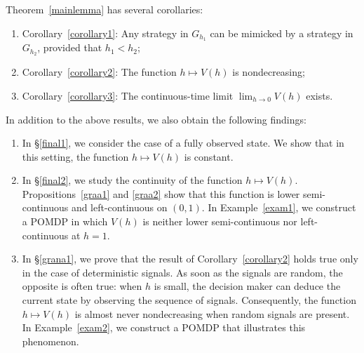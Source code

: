\documentclass[english,openary,11pt]{article}
\theoremstyle{definition}
\begin{document}
Theorem~\ref{mainlemma} has several corollaries: 
\begin{enumerate}
	\item Corollary~\ref{corollary1}: Any strategy in $G_{h_1}$ can be mimicked by a strategy in $G_{h_2}$, provided that $h_1 < h_2$; 
	\item Corollary~\ref{corollary2}: The function $h \mapsto V(h)$ is nondecreasing;
	\item Corollary~\ref{corollary3}: The continuous-time limit $\lim_{h \to 0} V(h)$ exists.
\end{enumerate}

In addition to the above results, we also obtain the following findings:
\begin{enumerate}
	\item In \S\ref{final1}, we consider the case of a fully observed state. We show that in this setting, the function $h \mapsto V(h)$ is constant.
	\item In \S\ref{final2}, we study the continuity of the function $h \mapsto V(h)$. Propositions~\ref{graa1} and \ref{graa2} show that this function is lower semi-continuous and left-continuous on $(0,1)$. In Example~\ref{exam1}, we construct a POMDP in which $V(h)$ is neither lower semi-continuous nor left-continuous at $h=1$.
	\item In \S\ref{grana1}, we prove that the result of Corollary~\ref{corollary2} holds true only in the case of deterministic signals. As soon as the signals are random, the opposite is often true: when $h$ is small, the decision maker can deduce the current state by observing the sequence of signals. Consequently, the function $h \mapsto V(h)$ is almost never nondecreasing when random signals are present. In Example~\ref{exam2}, we construct a POMDP that illustrates this phenomenon.
\end{enumerate}
\end{document}
